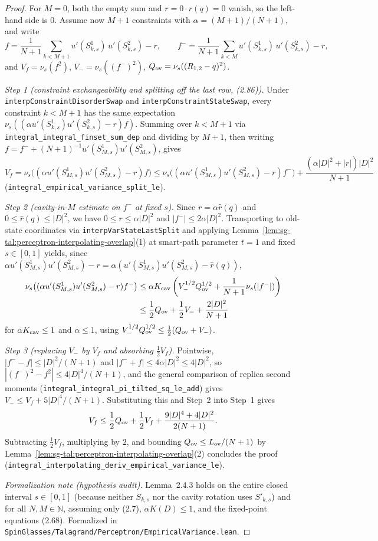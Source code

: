 \begin{proof}
  \leanok
For $M=0$, both the empty sum and $r=0\cdot\widehat r(q)=0$ vanish, so the left-hand side is $0$.
Assume now $M+1$ constraints with $\alpha=(M+1)/(N+1)$, and write
\[
 f=\frac{1}{N+1}\sum_{k<M+1}u'(S_{k,s}^1)\,u'(S_{k,s}^2)-r,\qquad
 f^-=\frac{1}{N+1}\sum_{k<M}u'(S_{k,s}^1)\,u'(S_{k,s}^2)-r,
\]
and $V_f=\nu_s(f^2)$, $V_-=\nu_s((f^-)^2)$, $Q_{\rm ov}=\nu_s((R_{1,2}-q)^2)$.

\emph{Step 1 (constraint exchangeability and splitting off the last row, (2.86)).} Under
\texttt{interpConstraintDisorderSwap} and \texttt{interpConstraintStateSwap}, every constraint
$k<M+1$ has the same expectation $\nu_s((\alpha u'(S_{k,s}^1)u'(S_{k,s}^2)-r)f)$. Summing over
$k<M+1$ via \texttt{integral\_integral\_finset\_sum\_dep} and dividing by $M+1$, then writing
$f=f^-+(N+1)^{-1}u'(S_{M,s}^1)u'(S_{M,s}^2)$, gives
\[
 V_f=\nu_s\bigl((\alpha u'(S_{M,s}^1)u'(S_{M,s}^2)-r)f\bigr)
 \le\nu_s\bigl((\alpha u'(S_{M,s}^1)u'(S_{M,s}^2)-r)f^-\bigr)
   +\frac{(\alpha|D|^2+|r|)|D|^2}{N+1}
\]
(\texttt{integral\_empirical\_variance\_split\_le}).

\emph{Step 2 (cavity-in-$M$ estimate on $f^-$ at fixed $s$).} Since $r=\alpha\widehat r(q)$ and
$0\le\widehat r(q)\le|D|^2$, we have $0\le r\le\alpha|D|^2$ and $|f^-|\le 2\alpha|D|^2$. Transporting
to old-state coordinates via \texttt{interpVarStateLastSplit} and applying
Lemma~\ref{lem:sg-tal:perceptron-interpolating-overlap}(1) at smart-path parameter $t=1$ and fixed
$s\in[0,1]$ yields, since $\alpha u'(S_{M,s}^1)u'(S_{M,s}^2)-r=\alpha(u'(S_{M,s}^1)u'(S_{M,s}^2)-\widehat r(q))$,
\begin{align*}
 \nu_s\bigl((\alpha u'(S_{M,s}^1)u'(S_{M,s}^2)-r)f^-\bigr)
 &\le\alpha K_{\rm cav}\left(V_-^{1/2}Q_{\rm ov}^{1/2}+\frac{1}{N+1}\nu_s(|f^-|)\right)\\
 &\le\frac{1}{2}Q_{\rm ov}+\frac{1}{2}V_-+\frac{2|D|^2}{N+1}
\end{align*}
for $\alpha K_{\rm cav}\le 1$ and $\alpha\le 1$, using $V_-^{1/2}Q_{\rm ov}^{1/2}\le\frac12(Q_{\rm ov}+V_-)$.

\emph{Step 3 (replacing $V_-$ by $V_f$ and absorbing $\frac12 V_f$).} Pointwise,
$|f^--f|\le|D|^2/(N+1)$ and $|f^-+f|\le 4\alpha|D|^2\le 4|D|^2$, so
$|(f^-)^2-f^2|\le 4|D|^4/(N+1)$, and the general comparison of replica second moments
(\texttt{integral\_integral\_pi\_tilted\_sq\_le\_add}) gives $V_-\le V_f+5|D|^4/(N+1)$. Substituting this and Step~2 into
Step~1 gives
\[
 V_f\le\frac{1}{2}Q_{\rm ov}+\frac{1}{2}V_f+\frac{9|D|^4+4|D|^2}{2(N+1)}.
\]
Subtracting $\frac12 V_f$, multiplying by $2$, and bounding $Q_{\rm ov}\le L_{\rm ov}/(N+1)$ by
Lemma~\ref{lem:sg-tal:perceptron-interpolating-overlap}(2) concludes the proof
(\texttt{integral\_interpolating\_deriv\_empirical\_variance\_le}).

\emph{Formalization note (hypothesis audit).} Lemma~2.4.3 holds on the entire closed interval
$s\in[0,1]$ (because neither $S_{k,s}$ nor the cavity rotation uses $S'_{k,s}$) and for all
$N,M\in\mathbb N$, assuming only (2.7), $\alpha K(D)\le 1$, and the fixed-point equations (2.68).
Formalized in \texttt{SpinGlasses/Talagrand/Perceptron/EmpiricalVariance.lean}.
\end{proof}

